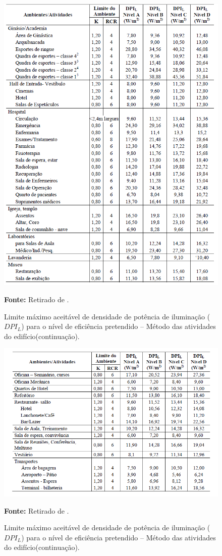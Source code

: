 \begin{figure}[H]
\centering
\includegraphics[width = 1.1\textwidth]{Figuras/tab1_2.PNG}
\caption{Limite máximo aceitável de densidade de potência de iluminação ($DPI_L$) para o nível de eficiência pretendido – Método das atividades do edifício(continuação).}
\label{tab2_2}
\textbf{Fonte:} Retirado de \cite{RTQ-C}.
\end{figure}

\begin{figure}[H]
\centering
\includegraphics[width = 1.1\textwidth]{Figuras/tab1_3.PNG}
\caption{Limite máximo aceitável de densidade de potência de iluminação ($DPI_L$) para o nível de eficiência pretendido – Método das atividades do edifício(continuação).}
\label{tab2_3}
\textbf{Fonte:} Retirado de \cite{RTQ-C}.
\end{figure}